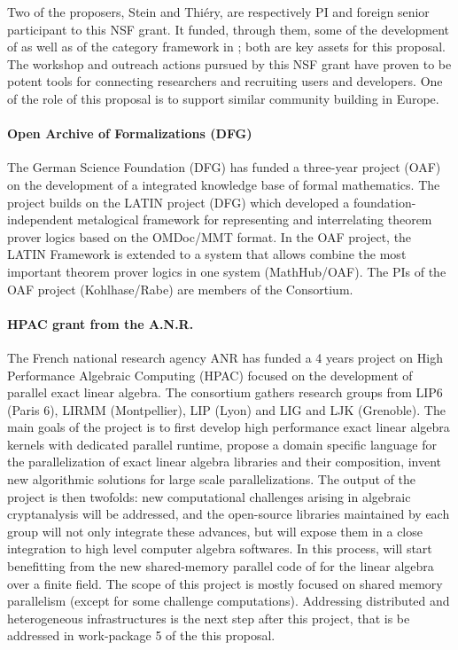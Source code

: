 Two of the proposers, Stein and Thiéry, are respectively PI and
foreign senior participant to this NSF grant. It funded, through them,
some of the development of \SMC as well as of the category framework
in \Sage; both are key assets for this proposal. The workshop and
outreach actions pursued by this NSF grant have proven to be potent
tools for connecting researchers and recruiting users and
developers. One of the role of this proposal is to support similar
community building in Europe.

\paragraph{Open Archive of Formalizations (DFG)} The German Science Foundation (DFG) has
funded a three-year project (OAF) on the development of a integrated knowledge base of
formal mathematics. The project builds on the LATIN project (DFG) which developed a
foundation-independent metalogical framework for representing and interrelating theorem
prover logics based on the OMDoc/MMT format. In the OAF project, the LATIN Framework is
extended to a system that allows combine the most important theorem prover logics in one
system (MathHub/OAF).  The PIs of the OAF project (Kohlhase/Rabe) are members of the
\TheProject Consortium.


\paragraph{HPAC grant from the A.N.R.}

The French national research agency ANR has funded a 4 years project
on High Performance Algebraic Computing (HPAC) focused on the
development of parallel exact linear algebra. The consortium gathers
research groups from LIP6 (Paris 6), LIRMM (Montpellier), LIP (Lyon)
and LIG and LJK (Grenoble). The main goals of the project is to first
develop high performance exact linear algebra kernels with dedicated
parallel runtime, propose a domain specific language for the
parallelization of exact linear algebra libraries and their
composition, invent new algorithmic solutions for large scale
parallelizations. The output of the project is then twofolds: new
computational challenges arising in algebraic cryptanalysis will be
addressed, and the open-source libraries maintained by each group will
not only integrate these advances, but will expose them in a close
integration to high level computer algebra softwares. In this process,
\Sage will start benefitting from the new shared-memory parallel code
of \Linbox for the linear algebra over a finite field.  The scope of
this project is mostly focused on shared memory parallelism (except
for some challenge computations). Addressing distributed and
heterogeneous infrastructures is the next step after this project,
that is be addressed in work-package 5 of the this proposal.


